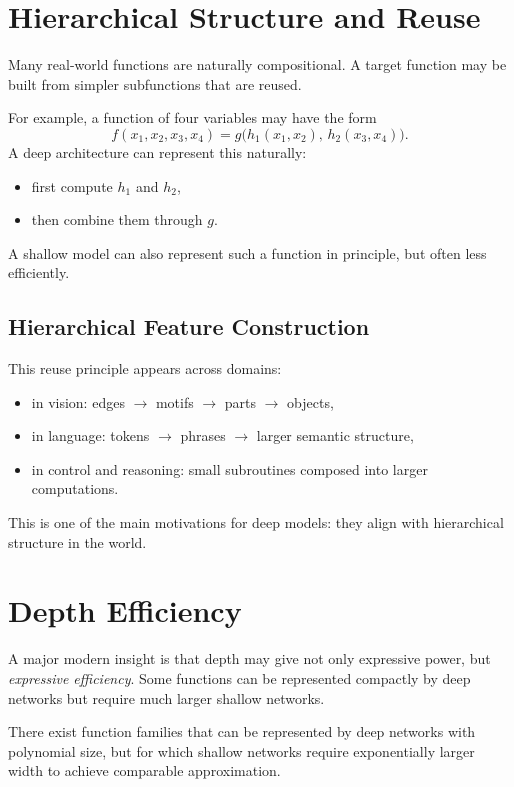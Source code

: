 \section{Hierarchical Structure and Reuse}

Many real-world functions are naturally compositional. A target function may be built from simpler subfunctions that are reused.

For example, a function of four variables may have the form
\[
f(x_1,x_2,x_3,x_4)=g\big(h_1(x_1,x_2),\,h_2(x_3,x_4)\big).
\]
A deep architecture can represent this naturally:
\begin{itemize}
    \item first compute $h_1$ and $h_2$,
    \item then combine them through $g$.
\end{itemize}

A shallow model can also represent such a function in principle, but often less efficiently.

\subsection{Hierarchical Feature Construction}

This reuse principle appears across domains:
\begin{itemize}
    \item in vision: edges $\to$ motifs $\to$ parts $\to$ objects,
    \item in language: tokens $\to$ phrases $\to$ larger semantic structure,
    \item in control and reasoning: small subroutines composed into larger computations.
\end{itemize}

This is one of the main motivations for deep models: they align with hierarchical structure in the world.

\section{Depth Efficiency}

A major modern insight is that depth may give not only expressive power, but \emph{expressive efficiency}. Some functions can be represented compactly by deep networks but require much larger shallow networks.

\begin{statement}
There exist function families that can be represented by deep networks with polynomial size, but for which shallow networks require exponentially larger width to achieve comparable approximation.
\end{statement}

